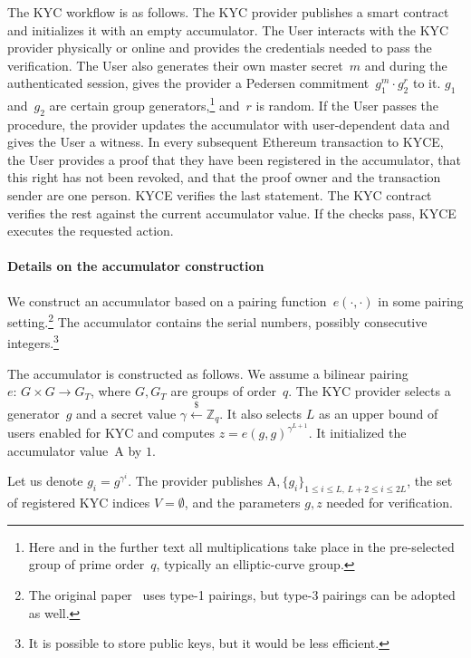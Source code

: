 The KYC workflow is as follows.
The KYC provider publishes a smart contract and initializes it with an empty accumulator.
The User interacts with the KYC provider physically or online and provides the credentials needed to pass the verification.
The User also generates their own master secret~$m$ and during the authenticated session, gives the provider a Pedersen commitment~$g_1^m\cdot g_2^r$ to it.
$g_1$ and~$g_2$ are certain group generators,\footnote{Here and in the further text all multiplications take place in the pre-selected group of prime order~$q$, typically an elliptic-curve group.} and~$r$ is random.
If the User passes the procedure, the provider updates the accumulator with user-dependent data and gives the User a witness.
In every subsequent Ethereum transaction to KYCE, the User provides a proof that they have been registered in the accumulator, that this right has not been revoked, and that the proof owner and the transaction sender are one person.
KYCE verifies the last statement.
The KYC contract verifies the rest against the current accumulator value.
If the checks pass, KYCE executes the requested action.

\paragraph{Details on the accumulator construction}
We construct an accumulator based on a pairing function~$e(\cdot,\cdot)$ in some pairing setting.\footnote{The original paper~\cite{Camenisch2009} uses type-1 pairings, but type-3 pairings can be adopted as well.}
The accumulator contains the serial numbers, possibly consecutive integers.\footnote{It is possible to store public keys, but it would be less efficient.}

The accumulator is constructed as follows.
We assume a bilinear pairing~$e:\,G\times G\rightarrow G_T$, where $G,G_T$ are groups of order~$q$.
The KYC provider selects a generator~$g$ and a secret value $\gamma\overset{\$}{\leftarrow} \mathbb{Z}_q$.
It also selects $L$ as an upper bound of users enabled for KYC and computes $z = e(g,g)^{\gamma^{L+1}}$.
It initialized the accumulator value~$\mathrm{A}$ by $1$.

Let us denote $g_i = g^{\gamma^i}$.
The provider publishes $\mathrm{A},\{g_i\}_{1\leq i\leq L, \,L+2\leq i \leq 2L}$, the set of registered KYC indices $V=\emptyset$, and the parameters $g,z$ needed for verification.

